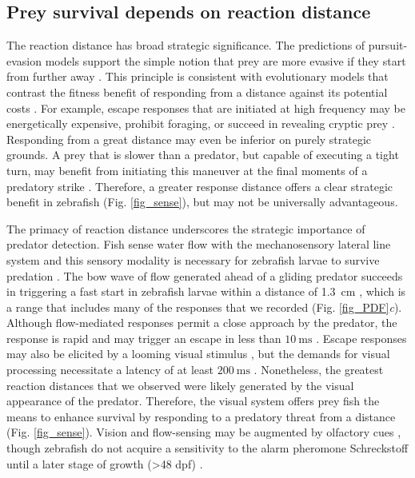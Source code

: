 \documentclass[]{rsos}%
\begin{document}
\subsection{Prey survival depends on reaction distance} 

The reaction distance has broad strategic significance.
The predictions of pursuit-evasion models support the simple notion that prey are more evasive if they start from further away \cite{Soto:2015cj,Isaacs:1965uz,Weihs:1984tb}.
This principle is consistent with evolutionary models that contrast the fitness benefit of responding from a distance against its potential costs \cite{Cooper:2015vf,Ydenberg:1986tm}.
For example, escape responses that are initiated at high frequency may be energetically expensive, prohibit foraging, or succeed in revealing cryptic prey \cite{Broom:2005gq}.
Responding from a great distance may even be inferior on purely strategic grounds.
A prey that is slower than a predator, but capable of executing a tight turn, may benefit from initiating this maneuver at the final moments of a predatory strike \cite{Howland:1974ud}.
Therefore, a greater response distance offers a clear strategic benefit in zebrafish (Fig. \ref{fig_sense}), but may not be universally advantageous.

The primacy of reaction distance underscores the strategic importance of predator detection. 
Fish sense water flow with the mechanosensory lateral line system and this sensory modality is necessary for zebrafish larvae to survive predation \cite{Stewart:2013bha}.
The bow wave of flow generated ahead of a gliding predator succeeds in triggering a fast start in zebrafish larvae within a distance of \SI{1.3}{\cm} \cite{Stewart:2014cma}, which is a range that includes many of the responses that we recorded (Fig. \ref{fig_PDF}\textit{c}).
Although flow-mediated responses permit a close approach by the predator, the response is rapid and may trigger an escape in less than $\SI{10}{\ms}$  \cite{Liu:1999fs}. 
Escape responses may also be elicited by a looming visual stimulus \cite{Bianco:2011ca}, but the demands for visual processing necessitate a latency of at least $\SI{200}{\ms}$ \cite{Burgess:2007vp}. 
Nonetheless, the greatest reaction distances that we observed were likely generated by the visual appearance of the predator.
Therefore, the visual system offers prey fish the means to enhance survival by responding to a predatory threat from a distance (Fig. \ref{fig_sense}).
Vision and flow-sensing may be augmented by olfactory cues \cite{Waldman:1982ic}, though zebrafish do not acquire a sensitivity to the alarm pheromone Schreckstoff until a later stage of growth (>48 dpf) \cite{Waldman:1982ic}.
\end{document}
